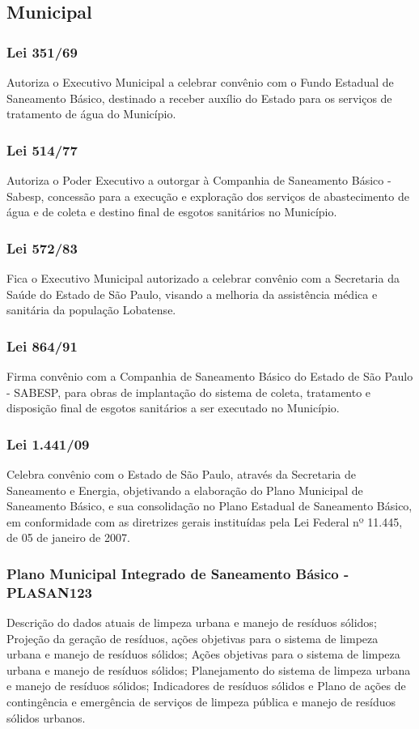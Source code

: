 \begin{subapend}
	\subsection{Municipal}
	\begin{subsubapend}
		\item \subsubsection{Lei 351/69}
		Autoriza o Executivo Municipal a celebrar convênio com o Fundo Estadual de Saneamento Básico, destinado a receber auxílio do Estado para os serviços de tratamento de água do Município.
		\subsubsection{Lei 514/77}
		Autoriza o Poder Executivo a outorgar à Companhia de Saneamento Básico - Sabesp, concessão para a execução e exploração dos serviços de abastecimento de água e de coleta e destino final de esgotos sanitários no Município.
		\subsubsection{Lei 572/83}
		Fica o Executivo Municipal autorizado a celebrar convênio com a Secretaria da Saúde do Estado de São Paulo, visando a melhoria da assistência médica e sanitária da população Lobatense.
		\subsubsection{Lei 864/91}
		Firma convênio com a Companhia de Saneamento Básico do Estado de São Paulo - SABESP, para obras de implantação do sistema de coleta, tratamento e disposição final de esgotos sanitários a ser executado no Município.
		\subsubsection{Lei 1.441/09}
		Celebra convênio com o Estado de São Paulo, através da Secretaria de Saneamento e Energia, objetivando a elaboração do Plano Municipal de Saneamento Básico, e sua consolidação no Plano Estadual de Saneamento Básico, em conformidade com as diretrizes gerais instituídas pela Lei Federal nº 11.445, de 05 de janeiro de 2007.
		\subsubsection{Plano Municipal Integrado de Saneamento Básico - PLASAN123}
		Descrição do dados atuais de limpeza urbana e manejo de resíduos sólidos; Projeção da geração de resíduos, ações objetivas para o sistema de limpeza urbana e manejo de resíduos sólidos; Ações objetivas para o sistema de limpeza urbana e manejo de resíduos sólidos; Planejamento do sistema de limpeza urbana e manejo de resíduos sólidos; Indicadores de resíduos sólidos e Plano de ações de contingência e emergência de serviços de limpeza pública e manejo de resíduos sólidos urbanos.

\end{subsubapend}
\end{subapend}
